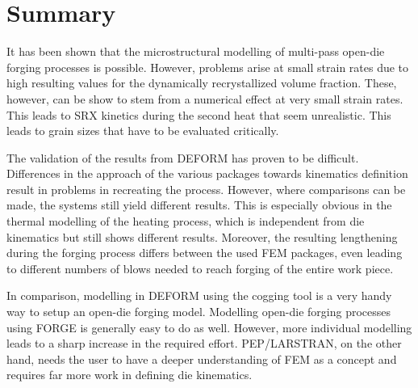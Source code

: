 \section{Summary}

It has been shown that the microstructural modelling of multi-pass open-die forging processes is possible. However, problems arise at small strain rates due to high resulting values for the dynamically recrystallized volume fraction. These, however, can be show to stem from a numerical effect at very small strain rates. This leads to SRX kinetics during the second heat that seem unrealistic. This leads to grain sizes that have to be evaluated critically.

The validation of the results from DEFORM has proven to be difficult. Differences in the approach of the various packages towards kinematics definition result in problems in recreating the process. However, where comparisons can be made, the systems still yield different results. This is especially obvious in the thermal modelling of the heating process, which is independent from die kinematics but still shows different results. Moreover, the resulting lengthening during the forging process differs between the used FEM packages, even leading to different numbers of blows needed to reach forging of the entire work piece.

In comparison, modelling in DEFORM using the cogging tool is a very handy way to setup an open-die forging model. Modelling open-die forging processes using FORGE is generally easy to do as well. However, more individual modelling leads to a sharp increase in the required effort. PEP/LARSTRAN, on the other hand, needs the user to have a deeper understanding of FEM as a concept and requires far more work in defining die kinematics.
